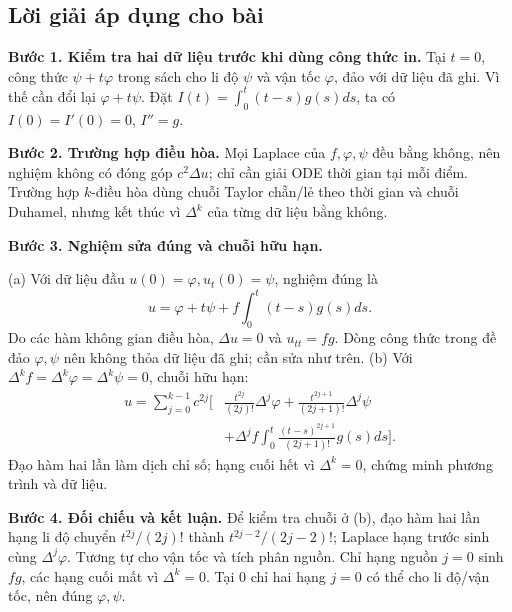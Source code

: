 \documentclass[10pt,a4paper]{article}
\begin{document}
\subsection*{Lời giải áp dụng cho bài}
\textbf{Bước 1. Kiểm tra hai dữ liệu trước khi dùng công thức in.} Tại $t=0$, công thức $\psi+t\varphi$ trong sách cho li độ $\psi$ và vận tốc $\varphi$, đảo với dữ liệu đã ghi. Vì thế cần đổi lại $\varphi+t\psi$. Đặt $I(t)=\int_0^t(t-s)g(s)ds$, ta có $I(0)=I'(0)=0$, $I''=g$.

\textbf{Bước 2. Trường hợp điều hòa.} Mọi Laplace của $f,\varphi,\psi$ đều bằng không, nên nghiệm không có đóng góp $c^2\Delta u$; chỉ cần giải ODE thời gian tại mỗi điểm. Trường hợp $k$-điều hòa dùng chuỗi Taylor chẵn/lẻ theo thời gian và chuỗi Duhamel, nhưng kết thúc vì $\Delta^k$ của từng dữ liệu bằng không.

\textbf{Bước 3. Nghiệm sửa đúng và chuỗi hữu hạn.}

(a) Với dữ liệu đầu $u(0)=\varphi,u_t(0)=\psi$, nghiệm đúng là
\[u=\varphi+t\psi+f\int_0^t(t-s)g(s)ds.\]
Do các hàm không gian điều hòa, $\Delta u=0$ và $u_{tt}=fg$. Dòng công thức trong đề đảo $\varphi,\psi$ nên không thỏa dữ liệu đã ghi; cần sửa như trên.
(b) Với $\Delta^kf=\Delta^k\varphi=\Delta^k\psi=0$, chuỗi hữu hạn:
\begin{align*}
u=\sum_{j=0}^{k-1}c^{2j}\bigg[&\frac{t^{2j}}{(2j)!}\Delta^j\varphi+\frac{t^{2j+1}}{(2j+1)!}\Delta^j\psi\\
&+\Delta^jf\int_0^t\frac{(t-s)^{2j+1}}{(2j+1)!}g(s)ds\bigg].
\end{align*}
Đạo hàm hai lần làm dịch chỉ số; hạng cuối hết vì $\Delta^k=0$, chứng minh phương trình và dữ liệu.

\textbf{Bước 4. Đối chiếu và kết luận.} Để kiểm tra chuỗi ở (b), đạo hàm hai lần hạng li độ chuyển $t^{2j}/(2j)!$ thành $t^{2j-2}/(2j-2)!$; Laplace hạng trước sinh cùng $\Delta^j\varphi$. Tương tự cho vận tốc và tích phân nguồn. Chỉ hạng nguồn $j=0$ sinh $fg$, các hạng cuối mất vì $\Delta^k=0$. Tại $0$ chỉ hai hạng $j=0$ có thể cho li độ/vận tốc, nên đúng $\varphi,\psi$.
\end{document}
